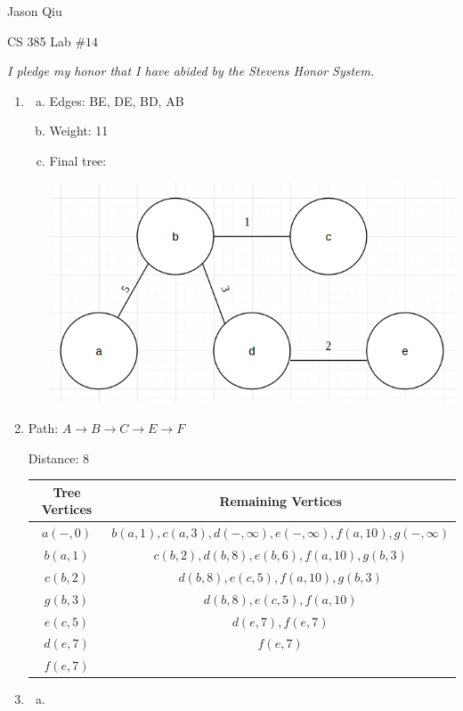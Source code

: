 \documentclass[a4paper,10pt]{article}
\begin{document}
Jason Qiu

CS 385 Lab $\#14$

\emph{I pledge my honor that I have abided by the Stevens Honor System.}

\begin{enumerate}[1.]
	\item \begin{enumerate}[(a)]
		\item Edges: BE, DE, BD, AB
		\item Weight: 11
		\item Final tree:
		
		\centerline{\includegraphics[scale=0.5]{fig1}}	
	\end{enumerate}
	\item Path: $A \rightarrow B \rightarrow C \rightarrow E \rightarrow F$
	
	Distance: 8
	
	\begin{tabular}{|c|c|}
	\hline
	\textbf{Tree Vertices} & \textbf{Remaining Vertices} \\
	\hline
	$a(-, 0)$ & $b(a, 1), c(a, 3), d(-, \infty), e(-, \infty), f(a, 10), g(-, \infty)$\\
	\hline
	$b(a, 1)$ & $c(b, 2), d(b, 8), e(b, 6), f(a, 10), g(b, 3)$\\
	\hline
	$c(b, 2)$ & $d(b, 8), e(c, 5), f(a, 10), g(b, 3)$\\
	\hline
	$g(b, 3)$ & $d(b, 8), e(c, 5), f(a, 10)$\\
	\hline
	$e(c, 5)$ & $d(e, 7), f(e, 7)$\\
	\hline
	$d(e, 7)$ & $f(e, 7)$\\
	\hline
	$f(e, 7)$ & \\
	\hline
	\end{tabular}
	
	\item \begin{enumerate}[(a)]
		\item \ 
		

\end{enumerate}
\end{enumerate}
\end{document}
